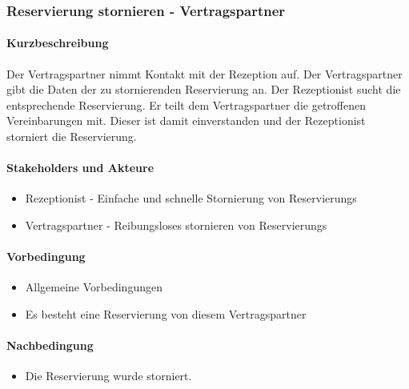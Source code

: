 \subsubsection{Reservierung stornieren - Vertragspartner}
\label{UseCase_ReservierungStornierenVertragspartner}

\paragraph{Kurzbeschreibung}
Der \Gls{Vertragspartner} nimmt Kontakt mit der \Gls{Rezeption} auf. Der \Gls{Vertragspartner} gibt die Daten der zu stornierenden Reservierung an. Der \Gls{Rezeptionist} sucht die entsprechende \Gls{Reservierung}. Er teilt dem \Gls{Vertragspartner} die getroffenen Vereinbarungen mit. Dieser ist damit einverstanden und der \Gls{Rezeptionist} storniert die \Gls{Reservierung}.

\paragraph{Stakeholders und Akteure}
\begin{itemize}
\item \Gls{Rezeptionist} - Einfache und schnelle Stornierung von \Glspl{Reservierung}
\item \Gls{Vertragspartner} - Reibungsloses stornieren von \Glspl{Reservierung}
\end{itemize}

\paragraph{Vorbedingung}
\begin{itemize}
\item Allgemeine Vorbedingungen
\item Es besteht eine \Gls{Reservierung} von diesem \Gls{Vertragspartner}
\end{itemize}

\paragraph{Nachbedingung}
\begin{itemize}
\item Die \Gls{Reservierung} wurde storniert.
\end{itemize}

